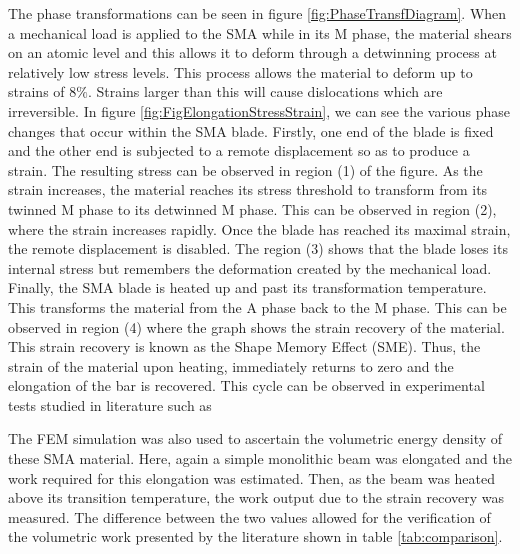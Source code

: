 The phase transformations can be seen in figure \ref{fig:PhaseTransfDiagram}. When a mechanical load is applied to the SMA while in its M phase, the material shears on an atomic level and this allows it to deform through a detwinning process at relatively low stress levels. This process allows the material to deform up to strains of 8$\%$. Strains larger than this will cause dislocations which are irreversible. In figure \ref{fig:FigElongationStressStrain}, we can see the various phase changes that occur within the SMA blade. Firstly, one end of the blade is fixed and the other end is subjected to a remote displacement so as to produce a strain. The resulting stress can be observed in region (1) of the figure. As the strain increases, the material reaches its stress threshold to transform from its twinned M phase to its detwinned M phase. This can be observed in region (2), where the strain increases rapidly. Once the blade has reached its maximal strain, the remote displacement is disabled. The region (3) shows that the blade loses its internal stress but remembers the deformation created by the mechanical load. Finally, the SMA blade is heated up and past its transformation temperature. This transforms the material from the A phase back to the M phase. This can be observed in region (4) where the graph shows the strain recovery of the material. This strain recovery is known as the Shape Memory Effect (SME). Thus, the strain of the material upon heating, immediately returns to zero and the elongation of the bar is recovered. This cycle can be observed in experimental tests studied in literature such as \cite{hongchun_xie_design_2007, liu_asymmetry_1998}

The FEM simulation was also used to ascertain the volumetric energy density of these SMA material. Here, again a simple monolithic beam was elongated and the work required for this elongation was estimated. Then, as the beam was heated above its transition temperature, the work output due to the strain recovery was measured. The difference between the two values allowed for the verification of the volumetric work presented by the literature shown in table \ref{tab:comparison}.


